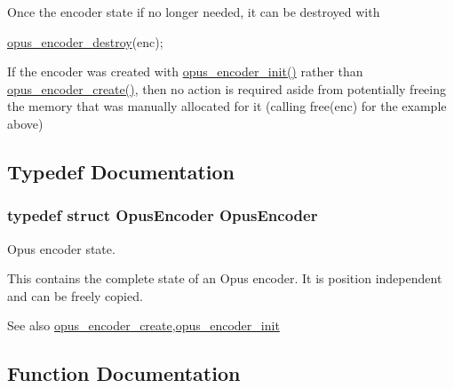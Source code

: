 Once the encoder state if no longer needed, it can be destroyed with


\begin{DoxyCode}
\hyperlink{group__opus__encoder_ga5f4c05b4b51cdffec5a55dbf17bbfa1c}{opus\_encoder\_destroy}(enc);
\end{DoxyCode}


If the encoder was created with \hyperlink{group__opus__encoder_ga515db1c267a7421dacaad3610f79eb79}{opus\+\_\+encoder\+\_\+init()} rather than \hyperlink{group__opus__encoder_gaa89264fd93c9da70362a0c9b96b9ca88}{opus\+\_\+encoder\+\_\+create()}, then no action is required aside from potentially freeing the memory that was manually allocated for it (calling free(enc) for the example above) 

\subsection{Typedef Documentation}
\subsubsection[{\texorpdfstring{Opus\+Encoder}{OpusEncoder}}]{\setlength{\rightskip}{0pt plus 5cm}typedef struct {\bf Opus\+Encoder} {\bf Opus\+Encoder}}\hypertarget{group__opus__encoder_gaf461a3ef2f10c2fe8b994a176f06c9bd}{}\label{group__opus__encoder_gaf461a3ef2f10c2fe8b994a176f06c9bd}


Opus encoder state. 

This contains the complete state of an Opus encoder. It is position independent and can be freely copied. \begin{DoxySeeAlso}{See also}
\hyperlink{group__opus__encoder_gaa89264fd93c9da70362a0c9b96b9ca88}{opus\+\_\+encoder\+\_\+create},\hyperlink{group__opus__encoder_ga515db1c267a7421dacaad3610f79eb79}{opus\+\_\+encoder\+\_\+init} 
\end{DoxySeeAlso}


\subsection{Function Documentation}
